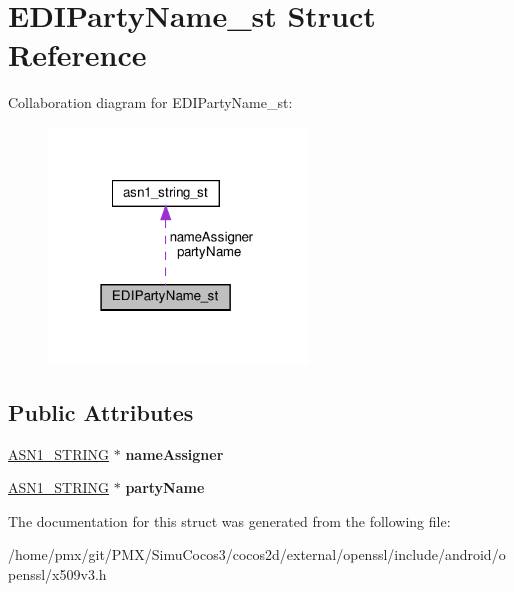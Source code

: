 \hypertarget{structEDIPartyName__st}{}\section{E\+D\+I\+Party\+Name\+\_\+st Struct Reference}
\label{structEDIPartyName__st}


Collaboration diagram for E\+D\+I\+Party\+Name\+\_\+st\+:
\nopagebreak
\begin{figure}[H]
\begin{center}
\leavevmode
\includegraphics[width=195pt]{structEDIPartyName__st__coll__graph}
\end{center}
\end{figure}
\subsection*{Public Attributes}
\begin{DoxyCompactItemize}
\item 
\mbox{\label{structEDIPartyName__st_af42e7d582c4d71616b10913df7158181}} 
\hyperlink{structasn1__string__st}{A\+S\+N1\+\_\+\+S\+T\+R\+I\+NG} $\ast$ {\bfseries name\+Assigner}
\item 
\mbox{\label{structEDIPartyName__st_adc32e09188beec9cb5cb4a84f9b42e64}} 
\hyperlink{structasn1__string__st}{A\+S\+N1\+\_\+\+S\+T\+R\+I\+NG} $\ast$ {\bfseries party\+Name}
\end{DoxyCompactItemize}


The documentation for this struct was generated from the following file\+:\begin{DoxyCompactItemize}
\item 
/home/pmx/git/\+P\+M\+X/\+Simu\+Cocos3/cocos2d/external/openssl/include/android/openssl/x509v3.\+h\end{DoxyCompactItemize}

